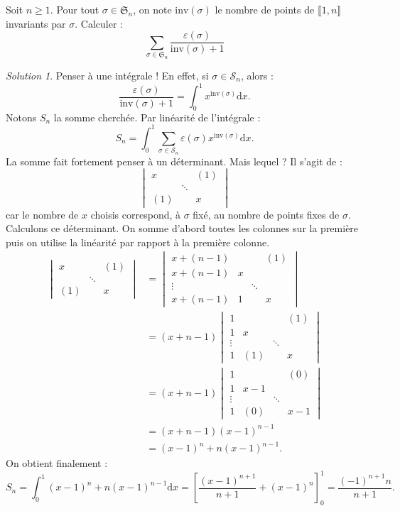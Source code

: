 \documentclass[french]{book}
\renewcommand{\d}{\text{d}}
\theoremstyle{definition}
\theoremstyle{remark}
\newtheorem*{sol}{Solution}
\begin{document}
\begin{exo}[2]{}
	Soit $n\geqslant1$. Pour tout $\sigma\in\mathfrak{S}_n$, on note $\text{inv}(\sigma)$ le nombre de points de $\llbracket1,n\rrbracket$ invariants par $\sigma$. Calculer : $$\sum_{\sigma\in\mathfrak{S}_n}\frac{\varepsilon(\sigma)}{\text{inv}(\sigma)+1}$$
\end{exo}
\begin{sol}
	Penser à une intégrale ! En effet, si $\sigma\in\mathcal{S}_n$, alors :
	$$\frac{\varepsilon(\sigma)}{\text{inv}(\sigma)+1}=\int_{0}^{1}x^{\text{inv}(\sigma)}\d x.$$ Notons $S_n$ la somme cherchée. Par linéarité de l'intégrale :
	$$S_n=\int_{0}^{1}\sum_{\sigma\in\mathcal{S}_n}\varepsilon(\sigma)x^{\text{inv}(\sigma)}\d x.$$
	La somme fait fortement penser à un déterminant. Mais lequel ? Il s'agit de :
	$$\begin{vmatrix}
		x&&(1)\\
		&\ddots&\\
		(1)&&x
	\end{vmatrix}$$ car le nombre de $x$ choisis correspond, à $\sigma$ fixé, au nombre de points fixes de $\sigma$. Calculons ce déterminant. On somme d'abord toutes les colonnes sur la première puis on utilise la linéarité par rapport à la première colonne.
	\begin{align*}
		\begin{vmatrix}
			x&&(1)\\
			&\ddots&\\
			(1)&&x
		\end{vmatrix}&=\begin{vmatrix}
		x+(n-1)&&&(1)\\
		x+(n-1)&x&&\\
		\vdots&&\ddots&\\
		x+(n-1)&1&&x
		\end{vmatrix}\\
		&=(x+n-1)\begin{vmatrix}
			1&&&(1)\\
			1&x&&\\
			\vdots&&\ddots&\\
			1&(1)&&x
		\end{vmatrix}\\
		&=(x+n-1)\begin{vmatrix}
			1&&&(0)\\
			1&x-1&&\\
			\vdots&&\ddots&\\
			1&(0)&&x-1
		\end{vmatrix}\\
		&=(x+n-1)(x-1)^{n-1}\\
		&=(x-1)^n+n(x-1)^{n-1}.
	\end{align*}
	On obtient finalement :
	$$S_n=\int_{0}^{1}(x-1)^n+n(x-1)^{n-1}\d x=\left[\frac{(x-1)^{n+1}}{n+1}+(x-1)^n\right]_0^1=\frac{(-1)^{n+1}n}{n+1}.$$
\end{sol}
\end{document}
